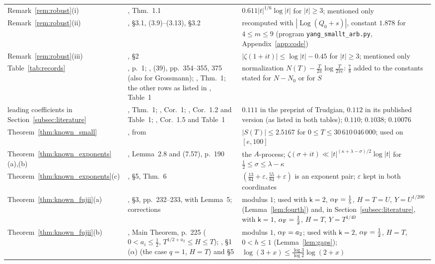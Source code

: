 \documentclass[11pt,a4paper]{article}
\makeatletter
\numberwithin{equation}{section}
\DeclareRobustCommand{\CGref}[1]{\ref{#1}}
\DeclareRobustCommand{\CGcite}[2][]{\if\relax\detokenize{#1}\relax\cite{#2}\else\cite[#1]{#2}\fi}
\let\CG@origref\ref
\newcommand{\CG@gettip}[1]{\@ifundefined{CGTip@#1}{#1}{\csname CGTip@#1\endcsname}}
\newcommand{\CG@getbib}[1]{\@ifundefined{CGBib@#1}{#1}{\csname CGBib@#1\endcsname}}
\DeclareRobustCommand{\CGref}[1]{\pdftooltip{\CG@origref{#1}}{\CG@gettip{#1}}}
\DeclareRobustCommand{\CGcite}[2][]{\pdftooltip{\if\relax\detokenize{#1}\relax\cite{#2}\else\cite[#1]{#2}\fi}{\CG@getbib{#2}}}
\theoremstyle{definition}
\theoremstyle{remark}
\newcommand{\Nz}{N_0} %
\makeatother
\begin{document}
\begin{center}
\begin{longtable}{p{}p{}p{}}
Remark~\CGref{rem:robust}(i) & \CGcite{Revers2026}, Thm.~1.1 & $0.611|t|^{1/6}\log|t|$ for $|t|\ge3$; mentioned only\\
Remark~\CGref{rem:robust}(ii) & \CGcite{Yang2024}, \S3.1, (3.9)--(3.13), \S3.2 & recomputed with $|\operatorname{Log}(Q_0+s)|$, constant $1.878$ for $4\le m\le9$ (program \texttt{yang\_smallt\_arb.py}, Appendix~\CGref{app:code})\\
Remark~\CGref{rem:robust}(iii) & \CGcite{HiaryLeongYang2024}, \S2 & $|\zeta(1+it)|\le\log|t|-0.45$ for $|t|\ge3$; mentioned only\\
Table~\CGref{tab:records} & \CGcite{VonMangoldt1905}, p.~1; \CGcite{Backlund1918}, (39), pp.~354--355, 375 (also for Grossmann); \CGcite{Trudgian2012}, Thm.~1; the other rows as listed in \CGcite{BellottiWong2025}, Table~1 & normalization $N(T)-\frac T{2\pi}\log\frac T{2\pi e}$: $\frac78$ added to the constants stated for $N-\Nz$ or for $S$\\
leading coefficients in Section~\CGref{subsec:literature} & \CGcite{Trudgian2014}, Thm.~1; \CGcite{PlattTrudgian2015}, Cor.~1; \CGcite{HasanalizadeShenWong2022}, Cor.~1.2 and Table~1; \CGcite{BellottiWong2025}, Cor.~1.5 and Table~1 & $0.111$ in the preprint of Trudgian, $0.112$ in its published version (as listed in both tables); $0.110$; $0.1038$; $0.10076$\\
Theorem~\CGref{thm:known_small} & \CGcite[(1.2)]{BellottiWong2025}, from \CGcite{Platt2017} & $|S(T)|\le2.5167$ for $0\le T\le30\,610\,046\,000$; used on $[e,100]$\\
Theorem~\CGref{thm:known_exponents}(a),(b) & \CGcite{Ivic1985}, Lemma~2.8 and (7.57), p.~190 & the $A$-process; $\zeta(\sigma+it)\ll|t|^{(\kappa+\lambda-\sigma)/2}\log|t|$ for $\frac12\le\sigma\le\lambda-\kappa$\\
Theorem~\CGref{thm:known_exponents}(c) & \CGcite{Bourgain2017}, \S5, Thm.~6 & $(\frac{13}{84}+\varepsilon,\frac{55}{84}+\varepsilon)$ is an exponent pair; $\varepsilon$ kept in both coordinates\\
Theorem~\CGref{thm:known_fujii}(a) & \CGcite{Fujii1974}, \S3, pp.~232--233, with Lemma~5; corrections \CGcite[\S5]{Fujii1981} & modulus $1$; used with $\mathsf k=2$, $\alpha_{\rm F}=\frac15$, $H=T=U$, $Y=U^{1/200}$ (Lemma~\CGref{lem:fourth}) and, in Section~\CGref{subsec:literature}, with $\mathsf k=1$, $\alpha_{\rm F}=\frac12$, $H=T$, $Y=T^{1/40}$\\
Theorem~\CGref{thm:known_fujii}(b) & \CGcite{Fujii1974}, Main Theorem, p.~225 ($0<a_i\le\frac12$, $T^{1/2+a_2}\le H\le T$); \CGcite{Fujii1981}, \S1 ($\alpha$) (the case $q=1$, $H=T$) and \S5 & modulus $1$, $\alpha_{\rm F}=a_2$; used with $\mathsf k=2$, $\alpha_{\rm F}=\frac12$, $H=T$, $0<h\le1$ (Lemma~\CGref{lem:gaps}); $\log(3+x)\le\frac{\log3}{\log2}\log(2+x)$\\

\end{longtable}
\end{center}
\end{document}
